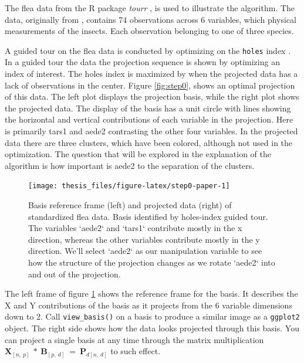 \documentclass{monashthesis}
\begin{document}
The flea data from the R package \emph{tourr}
\autocite{wickham_tourr_2011}, is used to illustrate the algorithm. The
data, originally from \textcite{lubischew_use_1962}, contains 74
observations across 6 variables, which physical measurements of the
insects. Each observation belonging to one of three species.

A guided tour on the flea data is conducted by optimizing on the
\texttt{holes} index \autocite{cook_interactive_2007}. In a guided tour
the data the projection sequence is shown by optimizing an index of
interest. The holes index is maximized by when the projected data has a
lack of observations in the center. Figure \ref{fig:step0}, shows an
optimal projection of this data. The left plot displays the projection
basis, while the right plot shows the projected data. The display of the
basis has a unit circle with lines showing the horizontal and vertical
contributions of each variable in the projection. Here is primarily
tars1 and aede2 contrasting the other four variables. In the projected
data there are three clusters, which have been colored, although not
used in the optimization. The question that will be explored in the
explanation of the algorithm is how important is aede2 to the separation
of the clusters.

\begin{figure}

{\centering \texttt{[image: thesis\_files/figure-latex/step0-paper-1]} 

}

\caption{Basis reference frame (left) and projected data (right) of standardized flea data. Basis identified by holes-index guided tour. The variables `aede2` and `tars1` contribute mostly in the x direction, whereas the other variables contribute mostly in the y direction. We'll select `aede2` as our manipulation variable to see how the structure of the projection changes as we rotate `aede2` into and out of the projection.}\label{fig:step0-paper}
\end{figure}

The left frame of figure \ref{fig:step0-paper} shows the reference frame
for the basis. It describes the X and Y contributions of the basis as it
projects from the 6 variable dimensions down to 2. Call
\texttt{view\_basis()} on a basis to produce a similar image as a
\texttt{ggplot2} object. The right side shows how the data looks
projected through this basis. You can project a single basis at any time
through the matrix multiplication
\(\textbf{X}_{[n,~p]} ~*~ \textbf{B}_{[p,~d]} ~=~ \textbf{P}_{d[n,~d]}\)
to such effect.
\end{document}
